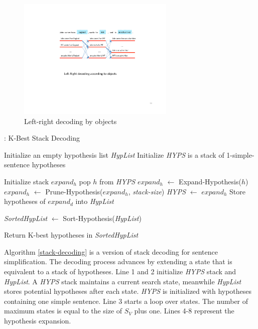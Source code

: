 \documentclass[10pt]{article}
\begin{document}
\begin{figure}[t]
	\centering
	\includegraphics[width=75mm]{figs/decode-by-object.pdf} 	
	\caption{Left-right decoding by objects}
	\label{fig::decode-by-object}
\end{figure}


\begin{algorithm}
	\caption{: K-Best Stack Decoding}	
	\label{stack-decoding}
	\begin{algorithmic}[1]
		\STATE Initialize an empty hypothesis list \textit{HypList}
		\STATE Initialize \textit{HYPS} is a stack of 1-simple-sentence hypotheses

			\STATE Initialize stack $expand_h$
				\STATE pop $h$ from \textit{HYPS}
				\STATE $expand_h$ $\gets$ Expand-Hypothesis($h$)
			\ENDWHILE
			\STATE $expand_h$ $\gets$ Prune-Hypothesis($expand_h$, \textit{stack-size})
			\STATE \textit{HYPS} $\gets$ $expand_h$			
			\STATE Store hypotheses of $expand_d$ into \textit{HypList}
		\ENDFOR
		
		\STATE \textit{SortedHypList} $\gets$ Sort-Hypothesis(\textit{HypList})
		
		\STATE Return K-best hypotheses in \textit{SortedHypList}
	\end{algorithmic}
\end{algorithm}

Algorithm \ref{stack-decoding} is a version of stack decoding for sentence simplification.
The decoding process advances by extending a state that is equivalent to a stack of hypotheses.
Line 1 and 2 initialize \textit{HYPS} stack and \textit{HypList}.
A \textit{HYPS} stack maintains a current search state, meanwhile \textit{HypList} stores potential hypotheses after each state.
\textit{HYPS} is initialized with hypotheses containing one simple sentence.
Line 3 starts a loop over states. 
The number of maximum states is equal to the size of $S_V$ plus one.
Lines 4-8 represent the hypothesis expansion.
\end{document}
